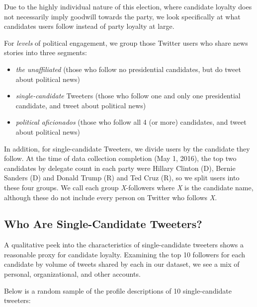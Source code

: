 Due to the highly individual nature of this election, where candidate loyalty does not necessarily imply goodwill towards the party, we look specifically at what candidates users follow instead of party loyalty at large. 

For \emph{levels} of political engagement, we group those Twitter users who share news stories into three segments: 

\begin{itemize}
  \item \emph{the unaffiliated} (those who follow no presidential candidates, but do tweet about political news)
  \item \emph{single-candidate} Tweeters (those who follow one and only one presidential candidate, and tweet about political news)
  \item \emph{political aficionados} (those who follow all 4 (or more) candidates, and tweet about political news)
\end{itemize}

In addition, for single-candidate Tweeters, we divide users by the candidate they follow. At the time of data collection completion (May 1, 2016), the top two candidates by delegate count in each party were Hillary Clinton (D), Bernie Sanders (D) and Donald Trump (R) and Ted Cruz (R), so we split users into these four groups. We call each group \emph{X}-followers where \emph{X} is the candidate name, although these do not include every person on Twitter who follows \emph{X}.  


\subsection{Who Are Single-Candidate Tweeters?}
A qualitative peek into the characteristics of single-candidate tweeters shows a reasonable proxy for candidate loyalty. Examining the top 10 followers for each candidate by volume of tweets shared by each in our dataset, we see a mix of personal, organizational, and other accounts.


Below is a random sample of the profile descriptions of 10 single-candidate tweeters:
 
